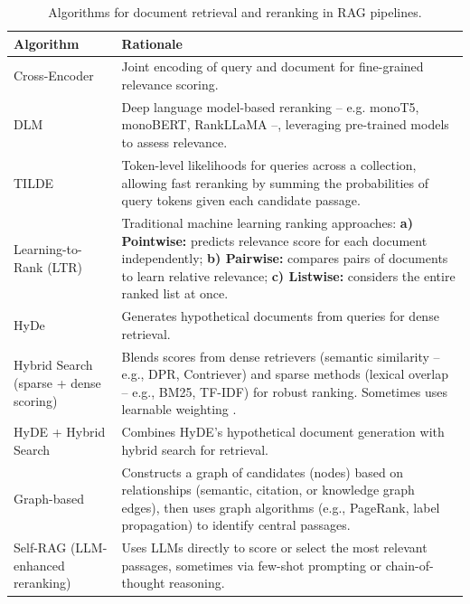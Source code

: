 \begin{spacing}{1.5}
\addtocounter{table}{-1}
\begin{table}[H]
\centering
\footnotesize
\begin{tabularx}{\textwidth}{l X}
\toprule
\textbf{Algorithm} & \textbf{Rationale} \\
\midrule
Cross-Encoder & Joint encoding of query and document for fine-grained relevance scoring. \\
\cmidrule(lr){1-2}
DLM & Deep language model-based reranking -- e.g. monoT5, monoBERT, RankLLaMA --, leveraging pre-trained models to assess relevance. \\
\cmidrule(lr){1-2}
TILDE \citep{zhuang_tilde_2021} & Token-level likelihoods for queries across a collection, allowing fast reranking by summing the probabilities of query tokens given each candidate passage. \\
\cmidrule(lr){1-2}
Learning-to-Rank (LTR) \citep{gupta_comprehensive_2024} & Traditional machine learning ranking approaches: \textbf{a) Pointwise:} predicts relevance score for each document independently; \textbf{b) Pairwise:} compares pairs of documents to learn relative relevance; \textbf{c) Listwise:} considers the entire ranked list at once.\\
\cmidrule(lr){1-2}
HyDe  & Generates hypothetical documents from queries for dense retrieval.\\
\cmidrule(lr){1-2}
Hybrid Search (sparse + dense scoring) & Blends scores from dense retrievers (semantic similarity -- e.g., DPR, Contriever) and sparse methods (lexical overlap -- e.g., BM25, TF-IDF) for robust ranking. Sometimes uses learnable weighting \citep{wang_searching_2024}. \\
\cmidrule(lr){1-2}
HyDE + Hybrid Search \citep{wang_searching_2024} & Combines HyDE's hypothetical document generation with hybrid search for retrieval. \\
\cmidrule(lr){1-2}
Graph-based \citep{han_retrieval-augmented_2025} & Constructs a graph of candidates (nodes) based on relationships (semantic, citation, or knowledge graph edges), then uses graph algorithms  (e.g., PageRank, label propagation) to identify central passages. \\
\cmidrule(lr){1-2}
Self-RAG (LLM-enhanced reranking) \citep{asai_self-rag_2023} & Uses LLMs directly to score or select the most relevant passages, sometimes via few-shot prompting or chain-of-thought reasoning. \\
\bottomrule
\end{tabularx}
\vspace{0.5em}
\caption{Algorithms for document retrieval and reranking in RAG pipelines.}
\label{tab:rerank_algorithms}
\end{table}




\end{spacing}
